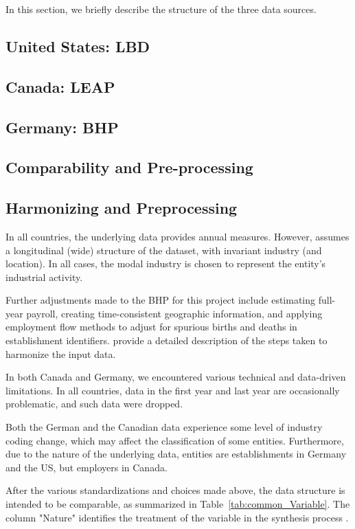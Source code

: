 
In this section, we briefly describe the structure of the three data sources.%

\subsection{United States: \acf{LBD}}



\subsection{Canada: \acf{LEAP}}



\subsection{Germany: \acf{BHP}}



\subsection{Comparability and Pre-processing}

\subsection{Harmonizing and Preprocessing}

In all countries, the underlying data provides annual measures. However, \SynLBD{} assumes a longitudinal (wide) structure of the dataset, with invariant industry (and location). In all cases, the modal industry is chosen to represent the entity's industrial activity. 

Further adjustments made to the \ac{BHP} for this project include estimating full-year payroll, creating time-consistent geographic information, and applying employment flow methods \citep{RePEc:iab:iabfme:201006_en} to adjust for spurious births and deaths in establishment identifiers. \citet{SJIAOS-2014b} provide a detailed description of the steps taken to harmonize the input data. 


In both Canada and Germany, we encountered various technical and data-driven limitations. In all countries, data in the first year and last year are occasionally problematic, and such data  were dropped. 

Both the German and the Canadian data experience some level of industry coding change, which may affect the classification of some entities. Furthermore, due to the nature of the underlying data, entities are establishments in Germany and the US, but employers in Canada. 

After the various standardizations and choices made above, the data structure is intended to be comparable, as summarized in Table~\ref{tab:common_Variable}. The column "Nature" identifies the treatment of the variable in the synthesis process \SynLBD. 

%

